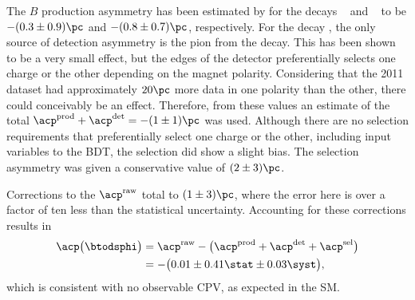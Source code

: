 The $B$ production asymmetry has been estimated by \lhcb for the decays
\decay{\Bp}{\jpsi\pip}~\cite{LHCb-PAPER-2011-024} and
\decay{\Bp}{\Dz\Kp}~\cite{LHCb-PAPER-2012-001} to be
$-(0.3\pm0.9)\pc$ and $-(0.8\pm0.7)\pc$, respectively.
For the decay \btodsphi, the only source of detection asymmetry is the pion from the \Ds decay.
This has been shown to be a very small effect, but the edges of the detector preferentially selects
one charge or the other depending on the magnet polarity.
Considering that the 2011 dataset had approximately $20\pc$ more data in one polarity than the
other, there could conceivably be an effect.
Therefore, from these values an estimate of the total $\acp^\mathrm{prod} + \acp^\mathrm{det}=-(1\pm1)\pc$
was used.
Although there are no selection requirements that preferentially select one charge or the other,
including input variables to the BDT, the selection did show a slight bias.
The selection asymmetry was given a conservative value of $(2\pm3)\pc$.

Corrections to the $\acp^\mathrm{raw}$ total to $(1\pm3)\pc$, where the error here is over a factor
of ten less than the statistical uncertainty.
Accounting for these corrections results in
\begin{align}
  \acp\big(\btodsphi\big)&=
  \acp^\mathrm{raw} - \big(\acp^\mathrm{prod} + \acp^\mathrm{det} +
  \acp^\mathrm{sel}\big)\nonumber\\
  &=
  -\big(0.01\pm0.41\stat\pm0.03\syst\big),
\end{align}
which is consistent with no observable CPV, as expected in the SM.



